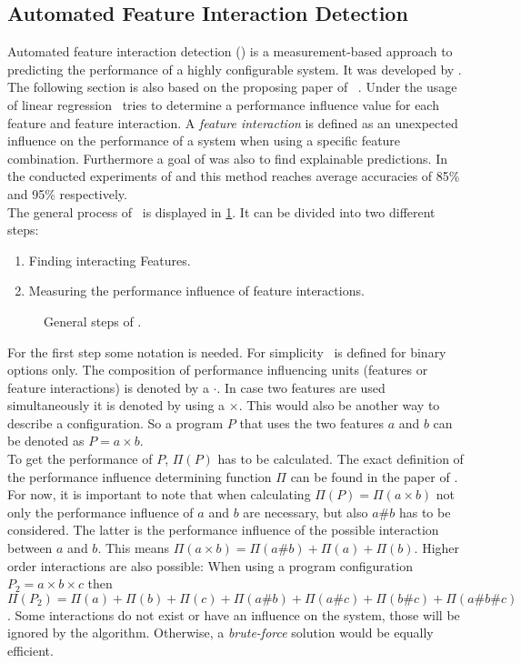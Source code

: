 

\subsection{Automated Feature Interaction Detection}\label{sec:AFID}

Automated feature interaction detection (\AFID) is a measurement-based approach to predicting the performance of a highly configurable system.
It was developed by \citet{AutomatedFeatureDetectionSiegmund2012}. The following section is also based on the proposing paper of \AFID~\cite{AutomatedFeatureDetectionSiegmund2012}. 
\noindent
Under the usage of linear regression \AFID~tries to determine a performance influence value for each feature and feature interaction. A \textit{feature interaction} is defined as an unexpected influence on the performance of a system when using a specific feature combination. Furthermore a goal of \citet{AutomatedFeatureDetectionSiegmund} was also to find explainable predictions.
In the conducted experiments of \citet{CostEfficientSampling_Gou_Siegmund_2015} and \citet{AutomatedFeatureDetectionSiegmund2012} this method reaches average accuracies of 85\% and 95\% respectively.
\\
\noindent
The general process of \AFID~is displayed in \cref{fig:AFIDGerneral}.
It can be divided into two different steps:
\begin{enumerate}
	\item Finding interacting Features.
	\item Measuring the performance influence of feature interactions.
\end{enumerate} 
\begin{figure}
	\centering
	\scalebox{.8}{
		
	}
	\caption{General steps of \AFID.}
	\label{fig:AFIDGerneral}
\end{figure}
For the first step some notation is needed. For simplicity \AFID~is defined for binary options only.
The composition of performance influencing units (features or feature interactions) is denoted by a $\cdot$. In case two features are used simultaneously it is denoted by using a $\times$. This would also be another way to describe a configuration. So a program $P$ that uses the two features $a$ and $b$ can be denoted as $P= a \times b$.\\
To get the performance of $P$, $\Pi(P)$ has to be calculated. The exact definition of the performance influence determining function $\Pi$ can be found in the paper of \citet{AutomatedFeatureDetectionSiegmund2012}. For now, it is important to note that when calculating $\Pi(P)=\Pi(a \times b)$ not only the performance influence of $a$ and $b$ are necessary, but also $a\#b$ has to be considered. The latter is the performance influence of the possible interaction between $a$ and $b$. 
This means $\Pi(a \times b) = \Pi(a\#b) + \Pi(a) + \Pi(b)$. Higher order interactions are also possible: When using a program configuration $P_2 = a \times b \times c$ then $\Pi(P_2) = \Pi(a) +  \Pi(b) +  \Pi(c) +  \Pi(a\#b) +  \Pi(a\#c) +  \Pi(b\#c) +  \Pi(a\#b\#c)$. Some interactions do not exist or have an influence on the system, those will be ignored by the algorithm. Otherwise, a \textit{brute-force} solution would be equally efficient.

